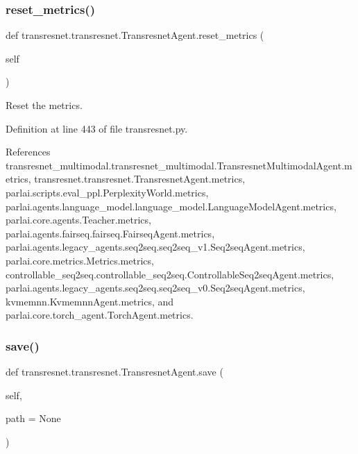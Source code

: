 \subsubsection{\texorpdfstring{reset\+\_\+metrics()}{reset\_metrics()}}
{\footnotesize\ttfamily def transresnet.\+transresnet.\+Transresnet\+Agent.\+reset\+\_\+metrics (\begin{DoxyParamCaption}\item[{}]{self }\end{DoxyParamCaption})}

\begin{DoxyVerb}Reset the metrics.\end{DoxyVerb}
 

Definition at line 443 of file transresnet.\+py.



References transresnet\+\_\+multimodal.\+transresnet\+\_\+multimodal.\+Transresnet\+Multimodal\+Agent.\+metrics, transresnet.\+transresnet.\+Transresnet\+Agent.\+metrics, parlai.\+scripts.\+eval\+\_\+ppl.\+Perplexity\+World.\+metrics, parlai.\+agents.\+language\+\_\+model.\+language\+\_\+model.\+Language\+Model\+Agent.\+metrics, parlai.\+core.\+agents.\+Teacher.\+metrics, parlai.\+agents.\+fairseq.\+fairseq.\+Fairseq\+Agent.\+metrics, parlai.\+agents.\+legacy\+\_\+agents.\+seq2seq.\+seq2seq\+\_\+v1.\+Seq2seq\+Agent.\+metrics, parlai.\+core.\+metrics.\+Metrics.\+metrics, controllable\+\_\+seq2seq.\+controllable\+\_\+seq2seq.\+Controllable\+Seq2seq\+Agent.\+metrics, parlai.\+agents.\+legacy\+\_\+agents.\+seq2seq.\+seq2seq\+\_\+v0.\+Seq2seq\+Agent.\+metrics, kvmemnn.\+Kvmemnn\+Agent.\+metrics, and parlai.\+core.\+torch\+\_\+agent.\+Torch\+Agent.\+metrics.

\mbox{\label{classtransresnet_1_1transresnet_1_1TransresnetAgent_abdcd97ee679f3026758814d6c2f0d538}} 
\subsubsection{\texorpdfstring{save()}{save()}}
{\footnotesize\ttfamily def transresnet.\+transresnet.\+Transresnet\+Agent.\+save (\begin{DoxyParamCaption}\item[{}]{self,  }\item[{}]{path = {\ttfamily None} }\end{DoxyParamCaption})}

